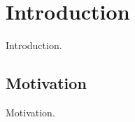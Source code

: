 \documentclass[Masterthesis.tex]{subfiles}
\begin{document}
\chapter{Introduction}

Introduction.

\section{Motivation}

Motivation.
\end{document}
